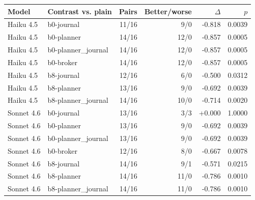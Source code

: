 \begin{tabular}{llrrrr}
\toprule
Model & Contrast vs. plain & Pairs & Better/worse & $\Delta$ & $p$ \\
\midrule
Haiku 4.5 & b0-journal & 11/16 & 9/0 & -0.818 & 0.0039 \\
Haiku 4.5 & b0-planner & 14/16 & 12/0 & -0.857 & 0.0005 \\
Haiku 4.5 & b0-planner\_journal & 14/16 & 12/0 & -0.857 & 0.0005 \\
Haiku 4.5 & b0-broker & 14/16 & 12/0 & -0.857 & 0.0005 \\
Haiku 4.5 & b8-journal & 12/16 & 6/0 & -0.500 & 0.0312 \\
Haiku 4.5 & b8-planner & 13/16 & 9/0 & -0.692 & 0.0039 \\
Haiku 4.5 & b8-planner\_journal & 14/16 & 10/0 & -0.714 & 0.0020 \\
Sonnet 4.6 & b0-journal & 13/16 & 3/3 & +0.000 & 1.0000 \\
Sonnet 4.6 & b0-planner & 13/16 & 9/0 & -0.692 & 0.0039 \\
Sonnet 4.6 & b0-planner\_journal & 13/16 & 9/0 & -0.692 & 0.0039 \\
Sonnet 4.6 & b0-broker & 12/16 & 8/0 & -0.667 & 0.0078 \\
Sonnet 4.6 & b8-journal & 14/16 & 9/1 & -0.571 & 0.0215 \\
Sonnet 4.6 & b8-planner & 14/16 & 11/0 & -0.786 & 0.0010 \\
Sonnet 4.6 & b8-planner\_journal & 14/16 & 11/0 & -0.786 & 0.0010 \\
\bottomrule
\end{tabular}
